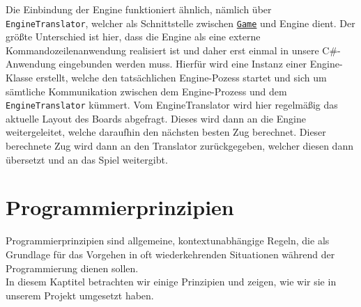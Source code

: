 \documentclass[
10pt, %
a4paper, %
oneside, %
headinclude,footinclude, %
BCOR5mm, %
]{scrartcl}
\begin{document}
\begin{onehalfspace}
Die Einbindung der Engine funktioniert ähnlich, nämlich über \texttt{EngineTranslator}, welcher als Schnittstelle zwischen \texttt{\href{https://github.com/schmida736/Chess-AdvancedSE/blob/main/Chess-AdvancedSE/Game\%20Elements/Game.cs}{Game}} und Engine dient. Der größte Unterschied ist hier, dass die Engine als eine externe Kommandozeilenanwendung realisiert ist und daher erst einmal in unsere C\#-Anwendung eingebunden werden muss.
Hierfür wird eine Instanz einer Engine-Klasse erstellt, welche den tatsächlichen Engine-Pozess startet und sich um sämtliche Kommunikation zwischen dem Engine-Prozess und dem \texttt{EngineTranslator} kümmert. Vom EngineTranslator wird hier regelmäßig das aktuelle Layout des Boards abgefragt. Dieses wird dann an die Engine weitergeleitet, welche daraufhin den nächsten besten Zug berechnet. Dieser berechnete Zug wird dann an den Translator zurückgegeben, welcher diesen dann übersetzt und an das Spiel weitergibt.
\newpage
\section{Programmierprinzipien}
Programmierprinzipien sind allgemeine, kontextunabhängige Regeln, die als Grundlage für das Vorgehen in oft wiederkehrenden Situationen während der Programmierung dienen sollen.\\
In diesem Kaptitel betrachten wir einige Prinzipien und zeigen, wie wir sie in unserem Projekt umgesetzt haben.

\end{onehalfspace}
\end{document}
